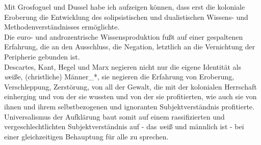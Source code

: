 \noindent Mit Grosfoguel und Dussel habe ich aufzeigen können, dass erst die koloniale
Eroberung die Entwicklung des solipsistischen und dualistischen Wissens- und
Methodenverständnisses ermöglichte. \\
Die euro- und androzentrische
Wissensproduktion fußt auf einer gespaltenen Erfahrung, die an den Ausschluss,
die Negation, letztlich an die Vernichtung der Peripherie gebunden ist.\\
Descartes, Kant, Hegel und Marx negieren nicht nur die eigene Identität als
\textit{w}eiße, (christliche)\footnotemark {} Männer\_*, sie
negieren die Erfahrung von Eroberung, Verschleppung, Zerstörung, von all der
Gewalt, die mit der kolonialen Herrschaft einherging und von der sie wussten
und von der sie profitierten, wie auch sie von ihnen und ihrem selbstbezogenen
und ignoranten Subjektverständnis profitierte. \\
Universalismus der Aufklärung
baut somit auf einem rassifizierten und vergeschlechtlichten Subjektverständnis
auf - das \textit{w}eiß und männlich ist - bei einer gleichzeitigen Behauptung für alle
zu sprechen.
